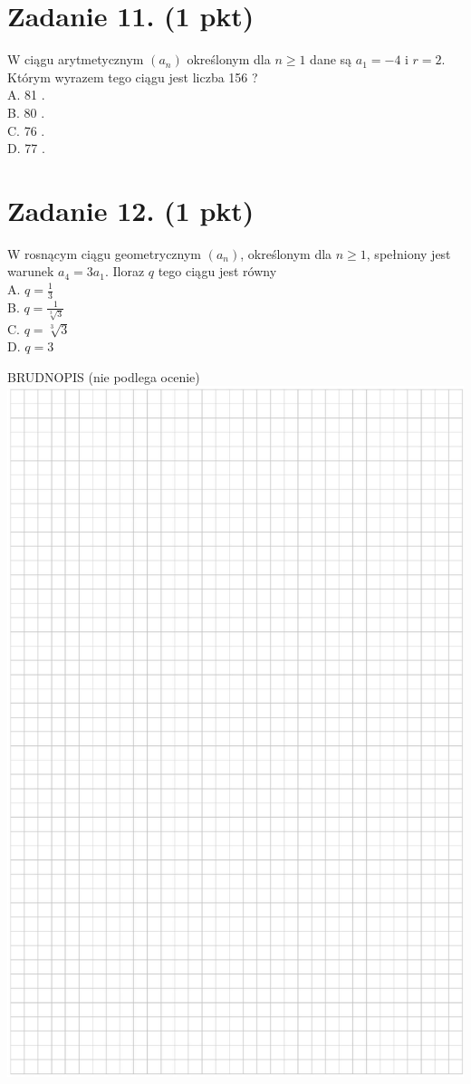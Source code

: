 \documentclass[10pt]{article}
\begin{document}
\section*{Zadanie 11. (1 pkt)}
W ciągu arytmetycznym \(\left(a_{n}\right)\) określonym dla \(n \geq 1\) dane są \(a_{1}=-4\) i \(r=2\). Którym wyrazem tego ciągu jest liczba 156 ?\\
A. 81 .\\
B. 80 .\\
C. 76 .\\
D. 77 .

\section*{Zadanie 12. (1 pkt)}
W rosnącym ciągu geometrycznym \(\left(a_{n}\right)\), określonym dla \(n \geq 1\), spełniony jest warunek \(a_{4}=3 a_{1}\). Iloraz \(q\) tego ciągu jest równy\\
A. \(q=\frac{1}{3}\)\\
B. \(q=\frac{1}{\sqrt[3]{3}}\)\\
C. \(q=\sqrt[3]{3}\)\\
D. \(q=3\)

BRUDNOPIS (nie podlega ocenie)\\
\includegraphics[max width=\textwidth, center]{2024_11_21_e19607c15353cb4d7e48g-05}
\end{document}
